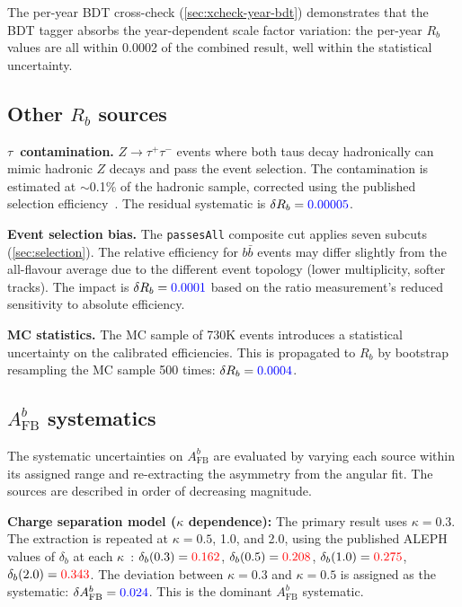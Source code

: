 \documentclass[11pt,a4paper]{article}
\newcommand{\measured}[1]{\textcolor{blue}{#1}}
\newcommand{\external}[1]{\textcolor{red}{#1}}
\begin{document}
The per-year BDT cross-check (\cref{sec:xcheck-year-bdt}) demonstrates
that the BDT tagger absorbs the year-dependent scale factor variation:
the per-year $R_b$ values are all within 0.0002 of the combined result,
well within the statistical uncertainty.

\subsection{Other $R_b$ sources}

\textbf{$\tau$~contamination.}
$Z \to \tau^+\tau^-$ events where both taus decay hadronically can mimic
hadronic $Z$ decays and pass the event selection.  The contamination is
estimated at $\sim$0.1\% of the hadronic sample, corrected using the
published selection efficiency~\cite{ALEPH:sigma_had}.  The residual
systematic is $\delta R_b = \measured{0.00005}$.

\textbf{Event selection bias.}
The \texttt{passesAll} composite cut applies seven subcuts
(\cref{sec:selection}).  The relative efficiency for $b\bar{b}$ events
may differ slightly from the all-flavour average due to the different
event topology (lower multiplicity, softer tracks).  The impact is
$\delta R_b = \measured{0.0001}$ based on the ratio measurement's
reduced sensitivity to absolute efficiency.

\textbf{MC statistics.}
The MC sample of 730K events introduces a statistical uncertainty on the
calibrated efficiencies.  This is propagated to $R_b$ by bootstrap
resampling the MC sample 500 times:
$\delta R_b = \measured{0.0004}$.

\subsection{$A_\mathrm{FB}^b$ systematics}
\label{sec:syst-afb}

The systematic uncertainties on $A_\mathrm{FB}^b$ are evaluated by
varying each source within its assigned range and re-extracting the
asymmetry from the angular fit.  The sources are described in order
of decreasing magnitude.

\textbf{Charge separation model ($\kappa$ dependence):}
The primary result uses $\kappa = 0.3$.  The extraction is repeated
at $\kappa = 0.5$, 1.0, and 2.0, using the published ALEPH values of
$\delta_b$ at each $\kappa$~\cite{ALEPH:AFBb}: $\delta_b(0.3) =
\external{0.162}$, $\delta_b(0.5) = \external{0.208}$,
$\delta_b(1.0) = \external{0.275}$, $\delta_b(2.0) = \external{0.343}$.
The deviation between $\kappa = 0.3$ and $\kappa = 0.5$ is assigned as
the systematic: $\delta A_\mathrm{FB}^b = \measured{0.024}$.  This is
the dominant $A_\mathrm{FB}^b$ systematic.
\end{document}
